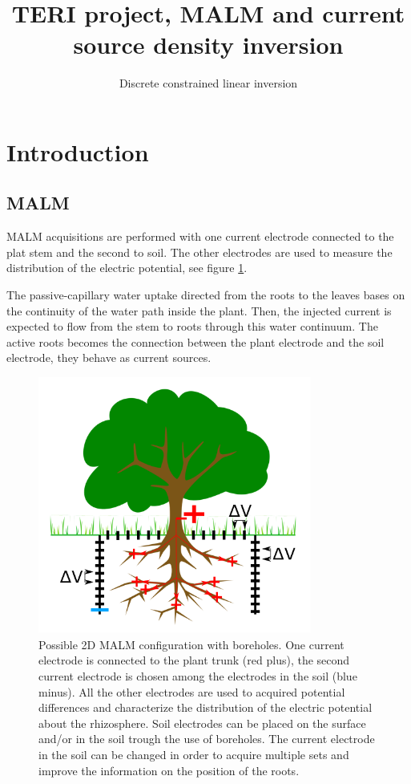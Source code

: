 \documentclass{article}
\title{TERI project, MALM and current source density inversion}
\date{Discrete constrained linear inversion}
\begin{document}
\maketitle
\graphicspath{ {./Figures/} }
\section{Introduction}
\subsection{MALM}
MALM acquisitions are performed with one current electrode connected to the plat stem and the second to soil.
The other electrodes are used to measure the distribution of the electric potential, see figure \ref{MALMscheme}.

The passive-capillary water uptake directed from the roots to the leaves bases on the continuity of the water path inside the plant.
Then, the injected current is expected to flow from the stem to roots through this water continuum.
The active roots becomes the connection between the plant electrode and the soil electrode, they behave as current sources.

\begin{figure}[h]
	\centering
	\captionsetup[sub]{margin=0.4cm}
	\includegraphics[width=9cm]{MALM.png}
	\caption{Possible 2D MALM configuration with boreholes. One current electrode is connected to the plant trunk (red plus), the second current electrode is chosen among the electrodes in the soil (blue minus). All the other electrodes are used to acquired potential differences and characterize the distribution of the electric potential about the rhizosphere. Soil electrodes can be placed on the surface and/or in the soil trough the use of boreholes. The current electrode in the soil can be changed in order to acquire multiple sets and improve the information on the position of the roots.\label{MALMscheme}}
\end{figure}
\end{document}
